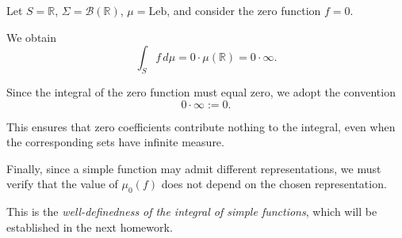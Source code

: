 \documentclass[11pt,a4paper]{article}
\begin{document}
Let $S=\mathbb R$, $\Sigma=\mathcal B(\mathbb R)$, $\mu=\mathrm{Leb}$, and consider the zero function $f=0$.

We obtain
\[
\int_S f\,d\mu
=0\cdot\mu(\mathbb R)
=0\cdot\infty.
\]

Since the integral of the zero function must equal zero, we adopt the convention
\[
0\cdot\infty:=0.
\]

This ensures that zero coefficients contribute nothing to the integral, even when the corresponding sets have infinite measure.

Finally, since a simple function may admit different representations, we must verify that the value of $\mu_0(f)$ does not depend on the chosen representation.

This is the \emph{well-definedness of the integral of simple functions}, which will be established in the next homework.
\end{document}
